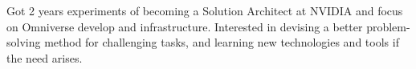 

\begin{cvparagraph}

Got 2 years experiments of becoming a Solution Architect at NVIDIA and focus on Omniverse develop and infrastructure. Interested in devising a better problem-solving method for challenging tasks, and learning new technologies and tools if the need arises.
\end{cvparagraph}
